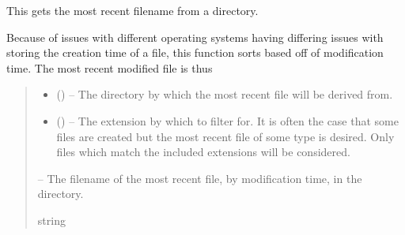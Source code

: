 \documentclass[letterpaper,11pt,english]{sphinxmanual}
\begin{document}
\begin{savenotes}\begin{fulllineitems}
\label{\detokenize{code/opihiexarata.library.path:opihiexarata.library.path.get_most_recent_filename_in_directory}}
\pysigstartsignatures
{}
\pysigstopsignatures
\sphinxAtStartPar
This gets the most recent filename from a directory.

\sphinxAtStartPar
Because of issues with different operating systems having differing
issues with storing the creation time of a file, this function sorts based
off of modification time. The most recent modified file is thus
\begin{quote}\begin{description}
\begin{itemize}
\item {} 
\sphinxAtStartPar
{} () – The directory by which the most recent file will be derived from.

\item {} 
\sphinxAtStartPar
{} (\sphinxstyleliteralemphasis{\sphinxupquote{, }}) – The extension by which to filter for. It is often the case that some
files are created but the most recent file of some type is desired.
Only files which match the included extensions will be considered.

\end{itemize}

\sphinxAtStartPar
{} – The filename of the most recent file, by modification time, in the
directory.

\sphinxAtStartPar
string

\end{description}\end{quote}

\end{fulllineitems}\end{savenotes}
\end{document}
